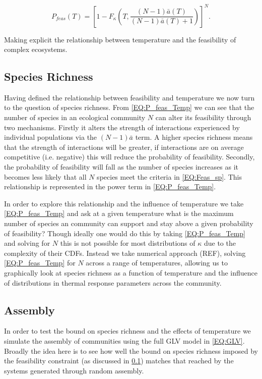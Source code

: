 \documentclass{article}
\begin{document}
\begin{equation} \label{EQ:P_feas_Temp}
    P_{feas}(T) = \left[1 - F_{\kappa}\left(T , \frac{(N-1)\bar{a}(T)}{(N-1)\bar{a}(T) + 1} \right) \right]^N.
\end{equation}

Making explicit the relationship between temperature and the feasibility of complex ecosystems. 

\subsection{Species Richness} \label{SEC:N_Sp}
Having defined the relationship between feasibility and temperature we now turn to the question of species richness. From \cref{EQ:P_feas_Temp} we can see that the number of species in an ecological community $N$ can alter its feasibility through two mechanisms. Firstly it alters the strength of interactions experienced by individual populations via the $(N-1) \bar{a}$ term. A higher species richness means that the strength of interactions will be greater, if interactions are on average competitive (i.e. negative) this will reduce the probability of feasibility. Secondly, the probability of feasibility will fall as the number of species increases as it becomes less likely that all $N$ species meet the criteria in \cref{EQ:Feas_sp}. This relationship is represented in the power term in \cref{EQ:P_feas_Temp}. 

In order to explore this relationship and the influence of temperature we take \cref{EQ:P_feas_Temp} and ask at a given temperature what is the maximum number of species an community can support and stay above a given probability of feasibility? Though ideally one would do this by taking \cref{EQ:P_feas_Temp} and solving for $N$ this is not possible for most distributions of $\kappa$ due to the complexity of their CDFs. Instead we take numerical approach (REF), solving \cref{EQ:P_feas_Temp}  for $N$ across a range of temperatures, allowing us to graphically look at species richness as a function of temperature and the influence of distributions in thermal response parameters across the community.

\subsection{Assembly}
In order to test the bound on species richness and the effects of temperature we simulate the assembly of communities using the full GLV model in \cref{EQ:GLV}. Broadly the idea here is to see how well the bound on species richness imposed by the feasibility constraint (as discussed in \cref{SEC:N_Sp}) matches that reached by the systems generated through random assembly.  
\end{document}
